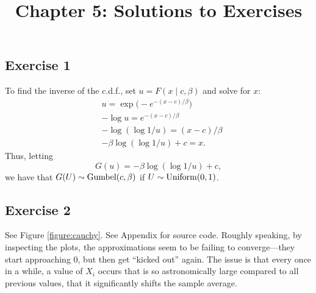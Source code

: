 \documentclass[12pt]{article}
\title{Chapter 5: Solutions to Exercises}
\author{}
\date{}
\begin{document}
\maketitle
\thispagestyle{firststyle}

\subsection*{Exercise 1}

To find the inverse of the c.d.f., set $u = F(x\mid c,\beta)$ and solve for $x$:
\begin{align*}
& u =\exp\Big(-e^{-(x-c)/\beta}\Big)\\
&-\log u = e^{-(x-c)/\beta}\\
&-\log(\log 1/u) = (x-c)/\beta\\
&-\beta\log(\log 1/u)+ c = x.
\end{align*}
Thus, letting
$$G(u) = -\beta\log(\log 1/u)+ c, $$
we have that $G(U)\sim\operatorname*{Gumbel}(c,\beta)$ if $U\sim\operatorname*{Uniform}(0,1)$.


\subsection*{Exercise 2}

See Figure \ref{figure:cauchy}. See Appendix for source code. Roughly speaking, by inspecting the plots, the approximations seem to be failing to converge---they start approaching 0, but then get ``kicked out'' again.
The issue is that every once in a while, a value of $X_i$ occurs that is so astronomically large compared to all previous values, that it significantly shifts the sample average. 
\end{document}
